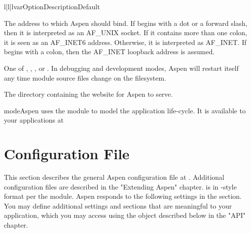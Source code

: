 \begin{tableiii}{l|l|l}{var}{Option}{Description}{Default}

    {The address to which Aspen should bind. If  begins with a dot
    or a forward slash, then it is interpreted as an AF_UNIX socket. If it
    contains more than one colon, it is seen as an AF_INET6 address. Otherwise,
    it is interpreted as AF_INET. If  begins with a colon, then the
    AF_INET loopback address is assumed.} {}


    {One of , , , or
    . In debugging and development modes, Aspen will restart
    itself any time module source files change on the filesystem.}
    {}

    {The directory containing the website for Aspen to serve.}
    {}


\end{tableiii}

\begin{seealso}

{mode}{Aspen uses the  module to model the application life-cycle.
It is available to your applications at }

\end{seealso}


\section{Configuration File \label{config-file}}

This section describes the general Aspen configuration file at
. Additional configuration files are described in the
"Extending Aspen" chapter.  is in -style format per
the  module. Aspen responds to the following settings in
the  section. You may define additional settings and sections that
are meaningful to your application, which you may access using the
 object described below in the "API" chapter.

